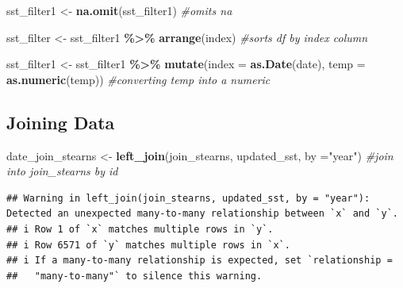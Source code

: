 \documentclass[
]{article}
\newenvironment{Shaded}{\begin{snugshade}}{\end{snugshade}}
\newcommand{\AttributeTok}[1]{\textcolor[rgb]{0.13,0.29,0.53}{#1}}
\newcommand{\CommentTok}[1]{\textcolor[rgb]{0.56,0.35,0.01}{\textit{#1}}}
\newcommand{\FunctionTok}[1]{\textcolor[rgb]{0.13,0.29,0.53}{\textbf{#1}}}
\newcommand{\NormalTok}[1]{#1}
\newcommand{\OtherTok}[1]{\textcolor[rgb]{0.56,0.35,0.01}{#1}}
\newcommand{\SpecialCharTok}[1]{\textcolor[rgb]{0.81,0.36,0.00}{\textbf{#1}}}
\newcommand{\StringTok}[1]{\textcolor[rgb]{0.31,0.60,0.02}{#1}}
\begin{document}
\begin{Shaded}
\begin{Highlighting}[]
\NormalTok{sst\_filter1 }\OtherTok{\textless{}{-}} \FunctionTok{na.omit}\NormalTok{(sst\_filter1) }\CommentTok{\#omits na}

\NormalTok{sst\_filter }\OtherTok{\textless{}{-}}\NormalTok{ sst\_filter1 }\SpecialCharTok{\%\textgreater{}\%}
  \FunctionTok{arrange}\NormalTok{(index) }\CommentTok{\#sorts df by index column}

\NormalTok{sst\_filter1 }\OtherTok{\textless{}{-}}\NormalTok{ sst\_filter1 }\SpecialCharTok{\%\textgreater{}\%}
  \FunctionTok{mutate}\NormalTok{(}\AttributeTok{index =} \FunctionTok{as.Date}\NormalTok{(date),}
         \AttributeTok{temp =} \FunctionTok{as.numeric}\NormalTok{(temp)) }\CommentTok{\#converting temp into a numeric}
\end{Highlighting}
\end{Shaded}

\hypertarget{joining-data}{%
\subsection{Joining Data}\label{joining-data}}

\begin{Shaded}
\begin{Highlighting}[]
\NormalTok{date\_join\_stearns }\OtherTok{\textless{}{-}} \FunctionTok{left\_join}\NormalTok{(join\_stearns, updated\_sst, }\AttributeTok{by =}\StringTok{"year"}\NormalTok{) }\CommentTok{\#join into join\_stearns by id}
\end{Highlighting}
\end{Shaded}

\begin{verbatim}
## Warning in left_join(join_stearns, updated_sst, by = "year"): Detected an unexpected many-to-many relationship between `x` and `y`.
## i Row 1 of `x` matches multiple rows in `y`.
## i Row 6571 of `y` matches multiple rows in `x`.
## i If a many-to-many relationship is expected, set `relationship =
##   "many-to-many"` to silence this warning.
\end{verbatim}
\end{document}
